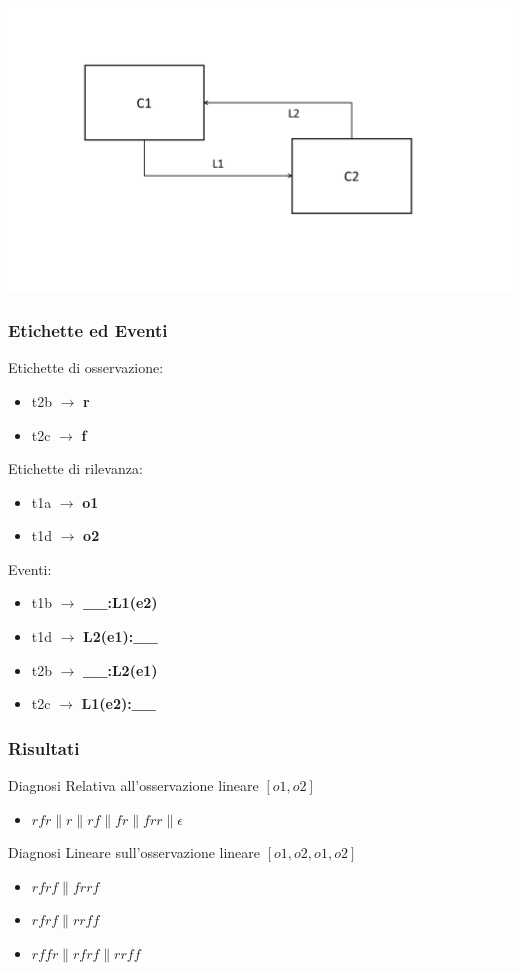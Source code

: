 \includegraphics[width=\textwidth]{immagini/customNetFA.png}

\subsubsection{Etichette ed Eventi}
Etichette di osservazione:
\begin{itemize}
    \item t2b $\rightarrow$ \textbf{r}
    \item t2c $\rightarrow$ \textbf{f}
\end{itemize} 
Etichette di rilevanza:
\begin{itemize}
    \item t1a $\rightarrow$ \textbf{o1}
    \item t1d $\rightarrow$ \textbf{o2}
\end{itemize}

Eventi:
\begin{itemize}
    \item t1b $\rightarrow$ \textbf{\_\_:L1(e2)}
    \item t1d $\rightarrow$ \textbf{L2(e1):\_\_}
    \item t2b $\rightarrow$ \textbf{\_\_:L2(e1)}
    \item t2c $\rightarrow$ \textbf{L1(e2):\_\_}
\end{itemize}

\subsubsection{Risultati}
Diagnosi Relativa all'osservazione lineare $[o1, o2]$
\begin{itemize}
    \item  $rfr\|r\|rf\|fr\|frr\|\epsilon$
\end{itemize}
Diagnosi Lineare sull'osservazione lineare $[o1, o2, o1, o2]$
\begin{itemize}
    \item $rfrf\|frrf$
    \item $rfrf\|rrff$
    \item $rffr\|rfrf\|rrff$
\end{itemize}

